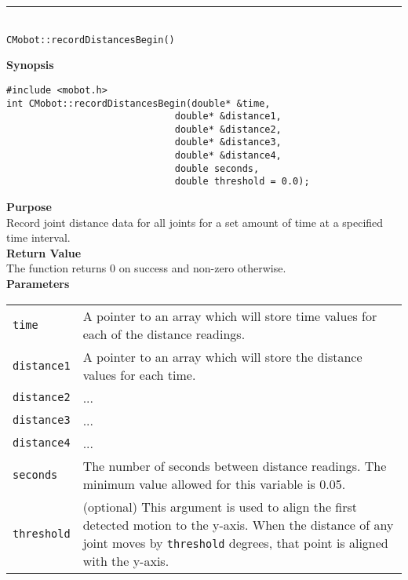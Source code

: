 \noindent
\vspace{5pt}
\rule{4.5in}{0.015in}\\
\noindent
{\LARGE \texttt{CMobot::recordDistancesBegin()}}\\
{}

\noindent
{\bf Synopsis}
\vspace{-8pt}
\begin{verbatim}
#include <mobot.h>
int CMobot::recordDistancesBegin(double* &time, 
                              double* &distance1, 
                              double* &distance2, 
                              double* &distance3, 
                              double* &distance4, 
                              double seconds,
                              double threshold = 0.0);
\end{verbatim}

\noindent
{\bf Purpose}\\
Record joint distance data for all joints for a set amount of time at a specified time interval.\\

\noindent
{\bf Return Value}\\
The function returns 0 on success and non-zero otherwise.\\

\noindent
{\bf Parameters}\\
\vspace{-0.1in}
\begin{description}
\item               
\begin{tabular}{p{15 mm}p{145 mm}}
\texttt{time} & A pointer to an array which will store time values for each of the distance readings. \\
\texttt{distance1} & A pointer to an array which will store the distance values for each time. \\
\texttt{distance2} & ... \\
\texttt{distance3} & ... \\
\texttt{distance4} & ... \\
\texttt{seconds} & The number of seconds between distance readings. The minimum value allowed for
this variable is 0.05. \\
\texttt{threshold} & (optional) This argument is used to align the first
detected motion to the y-axis. When the distance of any joint moves by
\texttt{threshold} degrees, that point is aligned with the y-axis.
\end{tabular}
\end{description}

